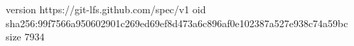 version https://git-lfs.github.com/spec/v1
oid sha256:99f7566a950602901c269ed69ef8d473a6c896af0e102387a527e938c74a59bc
size 7934
